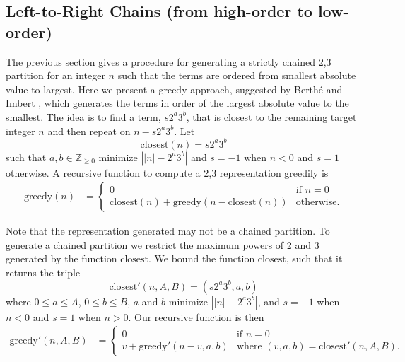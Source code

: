 \documentclass{ucalgthes1}
\theoremstyle{definition}
\newcommand{\ZZgez}{\mathbb{Z}_{\ge 0}}
\begin{document}
\subsection{Left-to-Right Chains (from high-order to low-order)}
\label{subsec:ltorChains}

\newcommand{\greedyltor}{\textrm{greedy}}
\newcommand{\greedychain}{\textrm{greedy}'}
\newcommand{\greedybound}{\textrm{greedy}''}
\newcommand{\closest}{\textrm{closest}}
\newcommand{\amax}{A}
\newcommand{\bmax}{B}


The previous section gives a procedure for generating a strictly chained 2,3 partition for an integer $n$ such that the terms are ordered from smallest absolute value to largest.  Here we present a greedy approach, suggested by Berth{\'e} and Imbert \cite{Berthe2009}, which generates the terms in order of the largest absolute value to the smallest. The idea is to find a term, $s2^a3^b$, that is closest to the remaining target integer $n$ and then repeat on $n - s2^a3^b$. Let
\[
\closest(n) = s2^a3^b
\]
such that $a,b \in \ZZgez$ minimize $\left| |n| - 2^a3^b \right|$ and $s = -1$ when $n < 0$ and $s = 1$ otherwise. A recursive function to compute a 2,3 representation greedily is
\begin{align*}
\greedyltor(n) &= \begin{cases}
              0 & \textrm{if $n = 0$} \\
              \closest(n) + \greedyltor(n - \closest(n)) & \textrm{otherwise}.
          \end{cases}
\end{align*}

\noindent
Note that the representation generated may not be a chained partition. To generate a chained partition we restrict the maximum powers of 2 and 3 generated by the function $\closest$.  We bound the function $\closest$, such that it returns the triple
\[
\closest'(n, \amax, \bmax) = (s2^a3^b, a, b)
\]
where $0 \le a \le \amax$, $0 \le b \le \bmax$, $a$ and $b$ minimize $\left| |n| - 2^a3^b \right|$, and $s=-1$ when $n < 0$ and $s=1$ when $n > 0$. Our recursive function is then
\begin{align*}
\greedychain(n, \amax, \bmax) &= \begin{cases}
        0 & \textrm{if $n = 0$} \\
        v + \greedychain(n - v, a, b) & \textrm{where $(v, a, b) = \closest'(n, \amax, \bmax)$}.
    \end{cases}
\end{align*}
\end{document}
